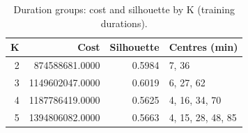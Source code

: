 \begin{table}[htbp]
\caption{Duration groups: cost and silhouette by K (training durations).}
\label{tab:duration-k}
\begin{tabular}{rrrl}
\toprule
K & Cost & Silhouette & Centres (min) \\
\midrule
2 & 874588681.0000 & 0.5984 & 7, 36 \\
3 & 1149602047.0000 & 0.6019 & 6, 27, 62 \\
4 & 1187786419.0000 & 0.5625 & 4, 16, 34, 70 \\
5 & 1394806082.0000 & 0.5663 & 4, 15, 28, 48, 85 \\
\bottomrule
\end{tabular}
\end{table}

